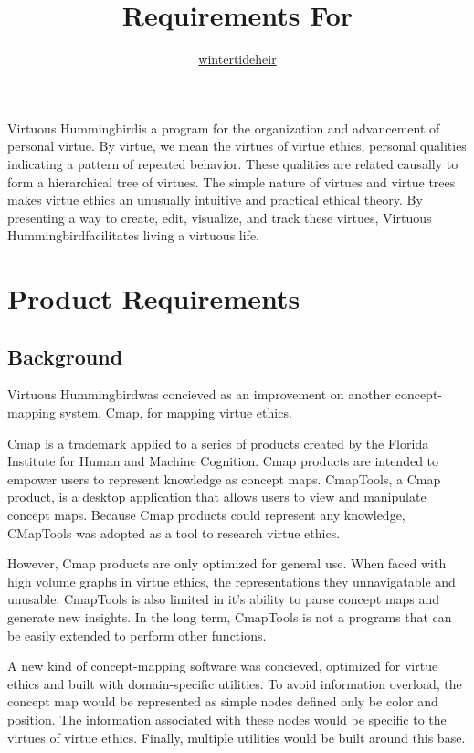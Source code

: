 \documentclass{article}
\title{Requirements For \name}
\author{\href{https://github.com/wintertideheir}{wintertideheir}}
\newcommand{\name}{Virtuous Hummingbird}
\begin{document}
\maketitle

\name is a program for the organization and advancement of personal virtue.
By virtue, we mean the virtues of virtue ethics, personal qualities indicating a pattern of repeated behavior.
These qualities are related causally to form a hierarchical tree of virtues. 
The simple nature of virtues and virtue trees makes virtue ethics an unusually intuitive and practical ethical theory.
By presenting a way to create, edit, visualize, and track these virtues, \name facilitates living a virtuous life.

\tableofcontents

\section{Product Requirements}

\subsection{Background}

\name was concieved as an improvement on another concept-mapping system, Cmap, for mapping virtue ethics.

Cmap is a trademark applied to a series of products created by the Florida Institute for Human and Machine Cognition.
Cmap products are intended to empower users to represent knowledge as concept maps.
CmapTools, a Cmap product, is a desktop application that allows users to view and manipulate concept maps.
Because Cmap products could represent any knowledge, CMapTools was adopted as a tool to research virtue ethics.

However, Cmap products are only optimized for general use.
When faced with high volume graphs in virtue ethics, the representations they unnavigatable and unusable.
CmapTools is also limited in it's ability to parse concept maps and generate new insights.
In the long term, CmapTools is not a programs that can be easily extended to perform other functions.

A new kind of concept-mapping software was concieved, optimized for virtue ethics and built with domain-specific utilities.
To avoid information overload, the concept map would be represented as simple nodes defined only be color and position.
The information associated with these nodes would be specific to the virtues of virtue ethics.
Finally, multiple utilities would be built around this base.
\end{document}

